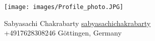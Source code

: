 \documentclass[letterpaper]{deedy-resume} %
\begin{document}

\lastupdated %

\hspace{0.5cm}
\vspace{-2cm}
\begin{minipage}[h]{0.3\textwidth} %
    \texttt{[image: images/Profile\_photo.JPG]}
\end{minipage}

\hfill

\hspace{4cm}
\begin{minipage}[t]{0.6\textwidth}
    \namesection
    {Sabyasachi}
    {Chakrabarty}
    { %
        \hspace{1pt}\faEnvelope \hspace{1pt} \href{mailto:sabyasachichakrbarty.96@gmail.com}{sabyasachichakrabarty}
        \\ 
        \faMobilePhone \hspace{1pt} +4917628308246
        \hspace{2pt} \faMapMarker \hspace{1pt} {Göttingen, Germany}
        }
\end{minipage}


\end{document}

